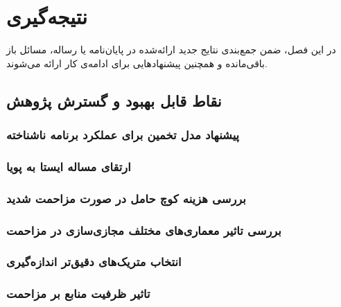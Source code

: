 
\chapter{نتیجه‌گیری}

در این فصل، ضمن جمع‌بندی نتایج جدید ارائه‌شده در پایان‌نامه یا رساله، 
مسائل باز باقی‌مانده و همچنین پیشنهادهایی برای ادامه‌ی کار ارائه می‌شوند.

\section{نقاط قابل بهبود و گسترش پژوهش}
\subsection{پیشنهاد مدل تخمین برای عملکرد برنامه ناشناخته}
\subsection{ارتقای مساله ایستا به پویا}
\subsection{بررسی هزینه کوچ حامل در صورت مزاحمت شدید}
\subsection{بررسی تاثیر معماری‌های مختلف مجازی‌سازی در مزاحمت}
\subsection{انتخاب متریک‌های دقیق‌تر اندازه‌گیری}
\subsection{تاثیر ظرفیت منابع بر مزاحمت}